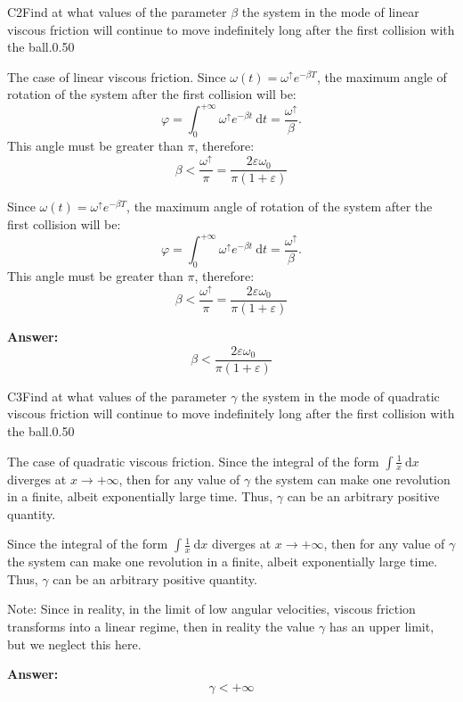 \documentclass[11pt,a4paper]{article}
\begin{document}
\begin{solcard}{C2}{Find at what values of the parameter $\beta$ the system in the mode of linear viscous friction will continue to move indefinitely long after the first collision with the ball.}{0.50}

The case of linear viscous friction. Since $\omega(t)=\omega^\uparrow e^{-\beta T}$, the maximum angle of rotation of the system after the first collision will be:\[\varphi=\int_0^{+\infty}\omega^\uparrow e^{-\beta t}~\mathrm dt=\frac{\omega^\uparrow}\beta.\]This angle must be greater than $\pi$, therefore:\[\beta < \frac{\omega^\uparrow}{\pi}=\frac{2\varepsilon\omega_0}{\pi(1+\varepsilon)}\]


Since $\omega(t)=\omega^\uparrow e^{-\beta T}$, the maximum angle of rotation of the system after the first collision will be:\[\varphi=\int_0^{+\infty}\omega^\uparrow e^{-\beta t}~\mathrm dt=\frac{\omega^\uparrow}\beta.\]This angle must be greater than $\pi$, therefore:\[\beta < \frac{\omega^\uparrow}{\pi}=\frac{2\varepsilon\omega_0}{\pi(1+\varepsilon)}\]

\par\smallskip\noindent\textbf{Answer:} \[\beta < \frac{2\varepsilon\omega_0}{\pi(1+\varepsilon)}\]
\end{solcard}

\begin{solcard}{C3}{Find at what values of the parameter $\gamma$ the system in the mode of quadratic viscous friction will continue to move indefinitely long after the first collision with the ball.}{0.50}

The case of quadratic viscous friction. Since the integral of the form $\int\frac1x~\mathrm dx$ diverges at $x\to+\infty$, then for any value of $\gamma$ the system can make one revolution in a finite, albeit exponentially large time. Thus, $\gamma$ can be an arbitrary positive quantity.


Since the integral of the form $\int\frac1x~\mathrm dx$ diverges at $x\to+\infty$, then for any value of $\gamma$ the system can make one revolution in a finite, albeit exponentially large time. Thus, $\gamma$ can be an arbitrary positive quantity.


Note: Since in reality, in the limit of low angular velocities, viscous friction transforms into a linear regime, then in reality the value $\gamma$ has an upper limit, but we neglect this here.

\par\smallskip\noindent\textbf{Answer:} \[\gamma < +\infty\]
\end{solcard}
\end{document}
